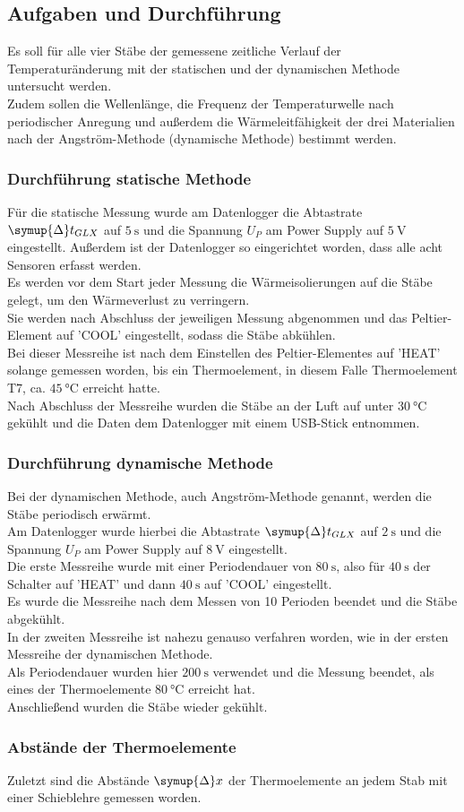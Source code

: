 \subsection{Aufgaben und Durchführung}
\label{subsec:AufgDurch}
Es soll für alle vier Stäbe der gemessene zeitliche Verlauf der Temperaturänderung mit der statischen und
der dynamischen Methode untersucht werden. \\
Zudem sollen die Wellenlänge, die Frequenz der Temperaturwelle
nach periodischer Anregung und außerdem die Wärmeleitfähigkeit der drei Materialien nach
der Angström-Methode (dynamische Methode) bestimmt werden.
\subsubsection{Durchführung statische Methode}
Für die statische Messung wurde am Datenlogger die Abtastrate $\symup{\Delta}t_{GLX}$ auf $\SI{5}{\second}$ und die Spannung
$U_P$ am Power Supply auf $\SI{5}{\volt}$ eingestellt. Außerdem ist der Datenlogger so eingerichtet worden, dass alle acht Sensoren
erfasst werden. \\
Es werden vor dem Start jeder Messung die Wärmeisolierungen auf die Stäbe gelegt, um den Wärmeverlust zu verringern.\\
Sie werden nach Abschluss der jeweiligen Messung abgenommen und das Peltier-Element auf 'COOL' eingestellt, sodass die Stäbe abkühlen.\\
Bei dieser Messreihe ist nach dem Einstellen des Peltier-Elementes auf 'HEAT' solange gemessen worden, bis ein Thermoelement, in diesem Falle
Thermoelement T7, ca. $\SI{45}{\celsius}$ erreicht hatte. \\
Nach Abschluss der Messreihe wurden die Stäbe an der Luft
auf unter $\SI{30}{\celsius}$ gekühlt und die Daten dem Datenlogger mit einem USB-Stick entnommen.
\subsubsection{Durchführung dynamische Methode}
Bei der dynamischen Methode, auch Angström-Methode genannt, werden die Stäbe periodisch erwärmt.\\
Am Datenlogger wurde hierbei die Abtastrate $\symup{\Delta}t_{GLX}$ auf $\SI{2}{\second}$
und die Spannung $U_P$ am Power Supply auf $\SI{8}{\volt}$ eingestellt.\\ 
Die erste Messreihe
wurde mit einer Periodendauer von $\SI{80}{\second}$, also für $\SI{40}{\second}$ der Schalter auf 'HEAT' und dann
$\SI{40}{\second}$ auf 'COOL' eingestellt. \\
Es wurde die Messreihe nach dem Messen von 10 Perioden beendet und die Stäbe abgekühlt.\\
In der zweiten Messreihe ist nahezu genauso verfahren worden, wie in der ersten Messreihe der dynamischen Methode. \\
Als Periodendauer wurden hier
$\SI{200}{\second}$ verwendet und die Messung beendet, als eines der Thermoelemente $\SI{80}{\celsius}$ erreicht hat.\\
Anschließend wurden die Stäbe wieder gekühlt.
\subsubsection{Abstände der Thermoelemente}
Zuletzt sind die Abstände $\symup{\Delta}x$ der Thermoelemente an jedem Stab mit einer Schieblehre gemessen worden.\\
